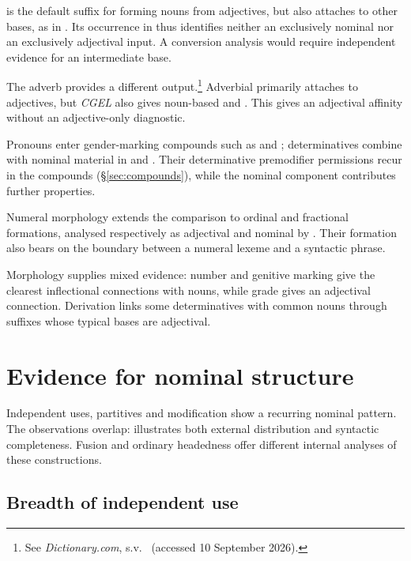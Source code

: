 \documentclass[12pt]{article}
\begin{document}
 is the default suffix for forming nouns from adjectives, but also attaches to other bases, as in . Its occurrence in  thus identifies neither an exclusively nominal nor an exclusively adjectival input. A conversion analysis would require independent evidence for an intermediate base.

The adverb  provides a different output.\footnote{See \textit{Dictionary.com}, s.v.\ \href{https://www.dictionary.com/browse/mostly}{} (accessed 10 September 2026).} Adverbial  primarily attaches to adjectives, but \textit{CGEL} also gives noun-based  and  \citep[566]{huddleston2002}. This gives  an adjectival affinity without an adjective-only diagnostic.

Pronouns enter gender-marking compounds such as  and  \citep[Ch.~19, §5.3]{huddleston2002}; determinatives combine with nominal material in  and . Their determinative premodifier permissions recur in the compounds (§\ref{sec:compounds}), while the nominal component contributes further properties.

Numeral morphology extends the comparison to ordinal and fractional formations, analysed respectively as adjectival and nominal by \textcite{reynolds2026numerals}. Their formation also bears on the boundary between a numeral lexeme and a syntactic phrase.

Morphology supplies mixed evidence: number and genitive marking give the clearest inflectional connections with nouns, while grade gives an adjectival connection. Derivation links some determinatives with common nouns through suffixes whose typical bases are adjectival.

\section{Evidence for nominal structure}\label{sec:evidence}

Independent uses, partitives and modification show a recurring nominal pattern. The observations overlap:  illustrates both external distribution and syntactic completeness. Fusion and ordinary headedness offer different internal analyses of these constructions.

\subsection{Breadth of independent use}\label{sec:independent}
\end{document}
